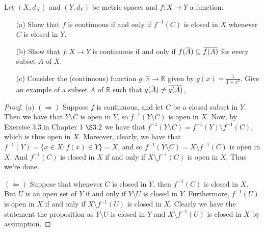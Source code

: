 \documentclass[oneside]{amsart}
\theoremstyle{definition}
\newcommand{\rr}{\mathbb R}
\newcommand{\overbar}[1]{\mkern 1.5mu\overline{\mkern-1.5mu#1\mkern-1.5mu}\mkern 1.5mu}
\begin{document}
 \begin{tcolorbox}[colback=black!5!white,colframe=black!75!black,title= Chapter 5; $\S 2.1$: Exercise $2.3.$]  Let $(X, d_X)$ and $(Y,d_Y)$ be metric spaces and $f \colon X \to Y$ a function.
 \begin{itemize}
 	\item [(a)] Show that $f$ is contiunous if and only if $f^{-1}(C)$ is closed in $X$ whenever $C$ is closed in $Y$.
 	\item [(b)] Show that $f \colon X \to Y$ is continuous if and only if $f (\overbar{A}) \subseteq \overbar{f(A)}$ for every subset $A$ of $X$.
 	\item [(c)] Consider the (continuous) function $g \colon \rr \to \rr$ given by $g(x) = \frac{1}{1+x^2}$. Give an example of a subset $A$ of $\rr$ such that $g(\overbar{A}) \neq \overbar{g(A)}$,
 \end{itemize}
\tcblower 
\begin{proof} (a) $(\Rightarrow)$ Suppose $f$ is continuous, and let $C$ be a closed subset in $Y$. Then we have that $Y \setminus C$ is open in $Y$, so $f^{-1} ( Y \setminus C)$ is open in $X$. Now, by Exercise 3.3.in Chapter 1 $\S 3.2$ we have that $f^{-1}(Y \setminus C) = f^{-1}(Y) \setminus f^{-1}(C)$, which is thus open in $X$. Moreover, clearly, we have that $f^{-1}(Y) = \{ x \in X \colon f(x) \in Y \} = X$, and so $f^{-1}(Y\setminus C) = X \setminus f^{-1}(C)$ is open in $X$. And $f^{-1}(C)$ is closed in $X$ if and only if $X \setminus f^{-1}(C)$ is open in $X$. Thus we're done. 

$(\Leftarrow)$ Suppose that whenever $C$ is closed in $Y$, then $f^{-1}(C)$ is closed in $X$. But $U$ is an open set of $Y$ if and only if $Y \setminus U$ is closed in $Y$. Furthermore, $f^{-1}(U)$ is open in $X$ if and only if $X \setminus f^{-1}(U)$ is closed in $X$. Clearly we have the statement the proposition as $Y \setminus U$ is closed in $Y$ and $X \setminus f^{-1}(U)$ is closed in $X$ by assumption.


\end{proof}
\end{tcolorbox}
\end{document}
